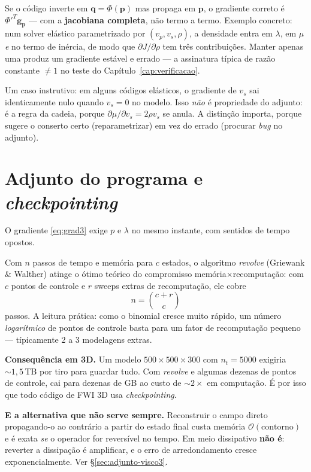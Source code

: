 \documentclass[11pt,a4paper,oneside]{report}
\begin{document}
\begin{armadilha}
Se o c\'odigo inverte em $\mathbf{q} = \Phi(\mathbf{p})$ mas propaga em
$\mathbf{p}$, o gradiente correto \'e $\Phi'^{T}\mathbf{g}_{\mathbf{p}}$ ---
com a \textbf{jacobiana completa}, n\~ao termo a termo. Exemplo concreto: num
solver el\'astico parametrizado por $(v_p,v_s,\rho)$, a densidade entra em
$\lambda$, em $\mu$ \emph{e} no termo de in\'ercia, de modo que
$\partial J/\partial\rho$ tem tr\^es contribui\c{c}\~oes. Manter apenas uma
produz um gradiente est\'avel e errado --- a assinatura t\'ipica de raz\~ao
constante $\ne 1$ no teste do Cap\'itulo~\ref{cap:verificacao}.

Um caso instrutivo: em alguns c\'odigos el\'asticos, o gradiente de $v_s$ sai
identicamente nulo quando $v_s = 0$ no modelo. Isso \emph{n\~ao} \'e
propriedade do adjunto: \'e a regra da cadeia, porque
$\partial\mu/\partial v_s = 2\rho v_s$ se anula. A distin\c{c}\~ao importa,
porque sugere o conserto certo (reparametrizar) em vez do errado (procurar
\emph{bug} no adjunto).
\end{armadilha}

\section{Adjunto do programa e \emph{checkpointing}}

O gradiente \eqref{eq:grad3} exige $p$ e $\lambda$ no mesmo instante, com
sentidos de tempo opostos.

\begin{teoria}
Com $n$ passos de tempo e mem\'oria para $c$ estados, o algoritmo
\emph{revolve} (Griewank \& Walther) atinge o \'otimo te\'orico do compromisso
mem\'oria$\times$recomputa\c{c}\~ao: com $c$ pontos de controle e $r$ sweeps
extras de recomputa\c{c}\~ao, ele cobre
\[
n = \binom{c+r}{c}
\]
passos. A leitura pr\'atica: como o binomial cresce muito r\'apido, um
n\'umero \emph{logar\'itmico} de pontos de controle basta para um fator de
recomputa\c{c}\~ao pequeno --- t\'ipicamente 2 a 3 modelagens extras.

\textbf{Consequ\^encia em 3D.} Um modelo $500\times500\times300$ com
$n_t = 5000$ exigiria $\sim 1{,}5$\,TB por tiro para guardar tudo. Com
\emph{revolve} e algumas dezenas de pontos de controle, cai para dezenas de
GB ao custo de $\sim 2\times$ em computa\c{c}\~ao. \'E por isso que todo
c\'odigo de FWI 3D usa \emph{checkpointing}.

\textbf{E a alternativa que n\~ao serve sempre.} Reconstruir o campo direto
propagando-o ao contr\'ario a partir do estado final custa mem\'oria
$\mathcal{O}(\text{contorno})$ e \'e exata \emph{se} o operador for
revers\'ivel no tempo. Em meio dissipativo \textbf{n\~ao \'e}: reverter a
dissipa\c{c}\~ao \'e amplificar, e o erro de arredondamento cresce
exponencialmente. Ver §\ref{sec:adjunto-visco3}.
\end{teoria}
\end{document}
